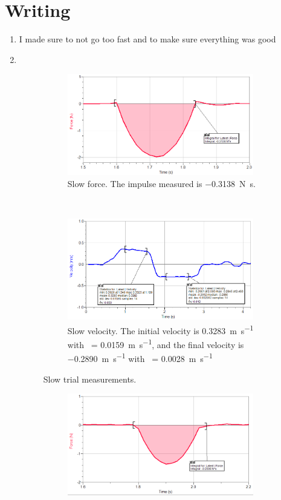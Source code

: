 \documentclass[12pt]{article}
\newcommand{\mps}[1]{\SI{#1}{\meter\per\second}}
\newcommand{\impls}[1]{\SI{#1}{\newton\second}}
\begin{document}
    \section{Writing}
    \begin{enumerate}
        [1)]
        \item I made sure to not go too fast and to make sure everything was good
        \item ~
        \begin{figure}[H]
            \begin{subfigure}[t]{0.5\textwidth}
                \centering
                \includegraphics[width=3.2in]{slow_force}
                \caption{Slow force. The impulse measured is \impls{-0.3138}.}
            \end{subfigure}%
            ~
            \begin{subfigure}[t]{0.5\textwidth}
                \centering
                \includegraphics[width=3.2in]{slow_velo}
                \caption{Slow velocity. The initial velocity is \mps{0.3283} with \textsigma\ = \mps{0.0159}, and the final velocity is \mps{-.2890} with \textsigma\ = \mps{0.0028}}
            \end{subfigure}
            \caption{Slow trial measurements.}
        \end{figure}
        \begin{figure}[H]
            \begin{subfigure}[t]{0.5\textwidth}
                \centering
                \includegraphics[width=3.2in]{slower_force}

\end{subfigure}
\end{figure}
\end{enumerate}
\end{document}

